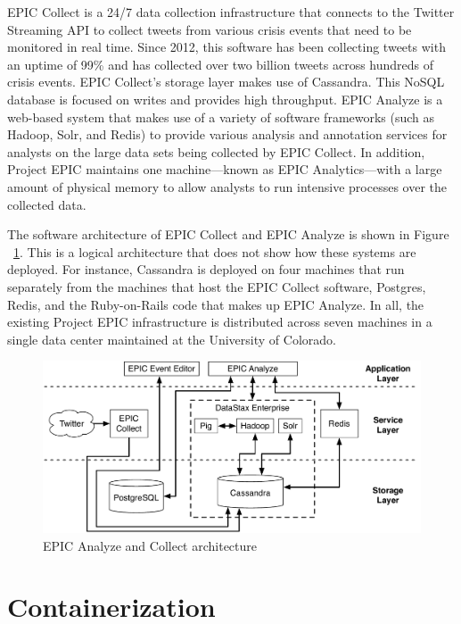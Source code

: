 EPIC Collect is a 24/7 data collection infrastructure that connects to the Twitter Streaming API to collect tweets from various crisis events that need to be monitored in real time. Since 2012, this software has been collecting tweets with an uptime of 99\% and has collected over two billion tweets across hundreds of crisis events. EPIC Collect’s storage layer makes use of Cassandra. This NoSQL database is focused on writes and provides high throughput. EPIC Analyze is a web-based system that makes use of a variety of software frameworks (such as Hadoop, Solr, and Redis) to provide various analysis and annotation services for analysts on the large data sets being collected by EPIC Collect. In addition, Project EPIC maintains one machine---known as EPIC Analytics---with a large amount of physical memory to allow analysts to run intensive processes over the collected data.

The software architecture of EPIC Collect and EPIC Analyze is shown in Figure ~\ref{fig:epicarch}. This is a logical architecture that does not show how these systems are deployed. For instance, Cassandra is deployed on four machines that run separately from the machines that host the EPIC Collect software, Postgres, Redis, and the Ruby-on-Rails code that makes up EPIC Analyze. In all, the existing Project EPIC infrastructure is distributed across seven machines in a single data center maintained at the University of Colorado.


\begin{figure}
\centering
\includegraphics[width=\textwidth]{Figures/old_arch}
\decoRule
\caption[EPIC Analyze and Collect architecture]{EPIC Analyze and Collect architecture}
\label{fig:epicarch}
\end{figure}


\section{Containerization}

